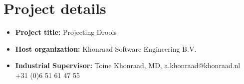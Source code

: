 \section*{Project details}

\begin{itemize}
    \item \textbf{Project title:} Projecting Drools
    \item \textbf{Host organization:} Khonraad Software Engineering B.V.
    \item \textbf{Industrial Supervisor:} Toine Khonraad, MD, a.khonraad@khonraad.nl\\ +31 (0)6 51 61 47 55
\end{itemize}